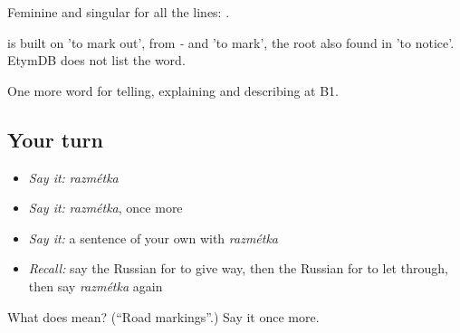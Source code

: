 Feminine and singular for all the lines: \emph{ }.

\begin{cousinweb}
\emph{} is built on \emph{} 'to mark out', from \emph{-} and \emph{} 'to mark', the root also found in \emph{} 'to notice'. EtymDB does not list the word.
\end{cousinweb}

\begin{grammarlens}[title={What you've built}]
One more word for telling, explaining and describing at B1.
\end{grammarlens}

\subsection*{Your turn}
\begin{itemize}
\raggedright
  \item \emph{Say it:} \emph{razmétka}
  \item \emph{Say it:} \emph{razmétka}, once more
  \item \emph{Say it:} a sentence of your own with \emph{razmétka}
  \item \emph{Recall:} say the Russian for to give way, then the Russian for to let through, then say \emph{razmétka} again
\end{itemize}

\begin{tcolorbox}[breakable,colback=teal!4,colframe=teal!35!black,title={Before you move on}]
What does  mean? (\textquotedblleft{}Road markings\textquotedblright{}.) Say it once more.
\end{tcolorbox}
